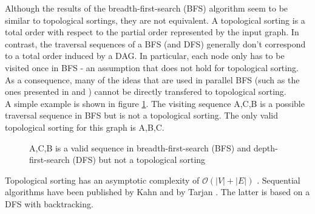 Although the results of the breadth-first-search (BFS) algorithm seem to be similar to topological sortings, they are not equivalent. A topological sorting is a total order with respect to the partial order represented by the input graph. In contrast, the traversal sequences of a BFS (and DFS) generally don’t correspond to a total order induced by a DAG. 
In particular, each node only has to be visited once in BFS - an assumption that does not hold for topological sorting. As a consequence, many of the ideas that are used in parallel BFS (such as the ones presented in \cite{bulucc2011parallel} and \cite{beamer2013direction}) cannot be directly transfered to topological sorting. \\
A simple example is shown in figure \ref{fig:diff-bfs}. The visiting sequence A,C,B is a possible traversal sequence in BFS but is not a topological sorting. The only valid topological sorting for this graph is A,B,C.


\begin{figure}[!hbp]
\centering
 

\caption{A,C,B is a valid sequence in breadth-first-search (BFS) and depth-first-search (DFS) but not a topological sorting}
\label{fig:diff-bfs}
\end{figure}

Topological sorting has an asymptotic complexity of $\mathcal{O}(|V|+|E|)$ \cite[Chapter~22.4]{cormen2001introduction}. Sequential algorithms have been published by Kahn \cite{kahn1962topological} and by Tarjan  \cite{tarjan1976edge}. The latter is based on a DFS with backtracking.

